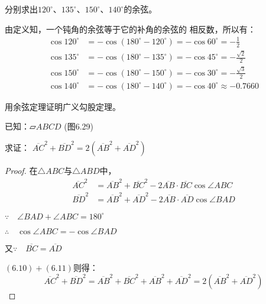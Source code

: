 \begin{example}
    分别求出$120^{\circ}$、$135^{\circ}$、$150^{\circ}$、$140^{\circ}$的余弦。
\end{example}

\begin{solution}
由定义知，一个钝角的余弦等于它的补角的余弦的
相反数，所以有：
\[\begin{split}
  \cos120^{\circ}&=-\cos(180^{\circ}-120^{\circ})=-\cos60^{\circ}=-\frac{1}{2}\\
  \cos135^{\circ}&=-\cos(180^{\circ}-135^{\circ})=-\cos45^{\circ}=-\frac{\sqrt{2}}{2}\\  
  \cos150^{\circ}&=-\cos(180^{\circ}-150^{\circ})=-\cos30^{\circ}=-
\frac{\sqrt{3}}{2}\\
\cos140^{\circ}&=-\cos(180^{\circ}-140^{\circ})=-\cos40^{\circ}\approx -0.7660  
\end{split}\]
\end{solution}

\begin{example}
    用余弦定理证明广义勾股定理。

    已知：$\parallelogram ABCD$ (图6.29)

    求证：
    $\overline{AC}^2+\overline{BD}^2=2(\overline{AB}^2+\overline{AD}^2)$
\end{example}

\begin{figure}[htp]
    \centering
{}
    \caption{}
\end{figure}

\begin{proof}
在$\triangle ABC$与$\triangle ABD$中，
\begin{align}
   \overline{AC}^2&=\overline{AB}^2+\overline{BC}^2-2\overline{AB}\cdot \overline{BC} \cos\angle ABC \\
    \overline{BD}^2&=\overline{AB}^2+\overline{AD}^2-2\overline{AB}\cdot \overline{AD}\cos\angle BAD
\end{align}

$\because\quad \angle BAD+\angle ABC =180^{\circ}$

$\therefore\quad \cos \angle ABC=-\cos\angle BAD$

又$\because\quad \overline{BC}=\overline{AD}$

$(6.10)+(6.11)$则得：
\[\overline{AC}^2+\overline{BD}^2=\overline{AB}^2+\overline{BC}^2+\overline{AB}^2+\overline{AD}^2=2\left(\overline{AB}^2+\overline{AD}^2\right)\]
\end{proof}

